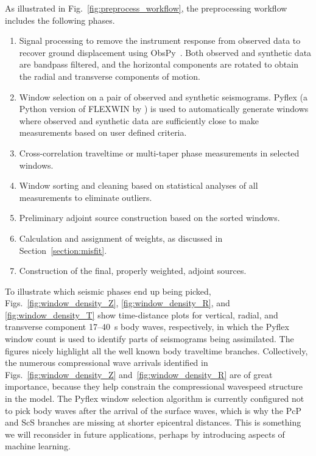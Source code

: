 As illustrated in Fig.~\ref{fig:preprocess_workflow}, the preprocessing workflow
includes the following phases.
\begin{enumerate}
  \item Signal processing to remove the instrument response from observed data
    to recover ground displacement using ObsPy~\cite{obspy2010}. Both observed and synthetic data are bandpass
    filtered, and the horizontal components are rotated to obtain the radial and transverse components of motion.
  \item Window selection on a pair of
    observed and synthetic seismograms. Pyflex (a Python version
    of FLEXWIN by \citet{krischer2015}) is
    used to automatically generate windows where observed and
    synthetic data are sufficiently close to make measurements based on user defined
    criteria.
  \item Cross-correlation traveltime or multi-taper phase measurements in selected windows.
  \item Window sorting and cleaning based on statistical analyses of all measurements to eliminate outliers.
  \item Preliminary adjoint source construction based on the sorted windows.
  \item Calculation and assignment of weights, as discussed in Section~\ref{section:misfit}.
  \item Construction of the final, properly weighted, adjoint sources.
\end{enumerate}

To illustrate which seismic phases end up being picked,
Figs.~\ref{fig:window_density_Z}, \ref{fig:window_density_R}, and \ref{fig:window_density_T} show time-distance plots
for vertical, radial, and transverse component 17--40~s body waves,
respectively,
in which the Pyflex window count is used to identify parts of seismograms being assimilated.
The figures nicely highlight all the well known body traveltime branches.
Collectively, the numerous compressional wave arrivals identified in Figs.~\ref{fig:window_density_Z} and~\ref{fig:window_density_R} are of great importance, because they help constrain the compressional wavespeed structure in the model.
The Pyflex window selection algorithm is currently configured not to pick body waves after the arrival of the surface waves, which is why the PcP and ScS branches are missing at shorter epicentral distances.
This is something we will reconsider in future applications, perhaps by introducing aspects of machine learning. 

